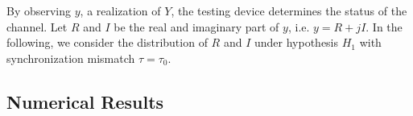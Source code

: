 By observing $y$, a realization  of $Y$, the testing device determines the status of the channel. Let $R$ and $I$  be the real  and imaginary part of $y$, i.e. $y=R+jI$. In the following, we consider the distribution of $R$ and $I$ under hypothesis $H_1$ with synchronization mismatch $\tau = \tau_0$.



 

\subsection{Numerical Results}

